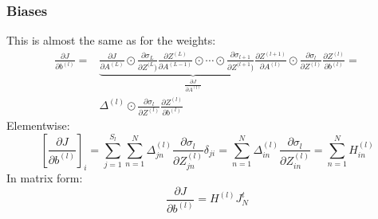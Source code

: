 \documentclass[12pt, a4paper]{article}
\numberwithin{equation}{section}
\begin{document}
\subsubsection{Biases}
This is almost the same as for the weights:
\begin{align}
\frac{\partial J}{\partial b^{(l)}}=&\underbrace{\frac{\partial J}{\partial A^{(L)}}\odot\frac{\partial\sigma_L}{\partial Z^{(L})}\frac{\partial Z^{(L)}}{\partial A^{(L-1)}}\odot\cdots\odot\frac{\partial\sigma_{l+1}}{\partial Z^{(l+1})}\frac{\partial Z^{(l+1)}}{\partial A^{(l)}}}_{\frac{\partial J}{\partial A^{(l)}}}\odot\frac{\partial\sigma_l}{\partial Z^{(l)}}\frac{\partial Z^{(l)}}{\partial b^{(l)}}=\\
&\Delta^{(l)}\odot\frac{\partial\sigma_l}{\partial Z^{(l)}}\frac{\partial Z^{(l)}}{\partial b^{(l)}}
\end{align}
Elementwise:
\begin{equation}
\left[\frac{\partial J}{\partial b^{(l)}}\right]_i=\sum_{j=1}^{S_l}\sum_{n=1}^N\Delta^{(l)}_{jn}\frac{\partial\sigma_l}{\partial Z^{(l)}_{jn}}\delta_{ji}=\sum_{n=1}^N\Delta^{(l)}_{in}\frac{\partial\sigma_l}{\partial Z^{(l)}_{in}}=\sum_{n=1}^N H^{(l)}_{in}
\end{equation}
In matrix form:
\begin{equation}
\frac{\partial J}{\partial b^{(l)}}=H^{(l)}J^t_N
\end{equation}
\end{document}

